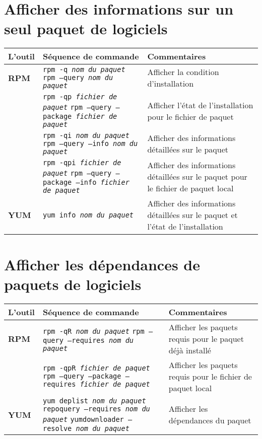 \documentclass[10pt,a4paper]{article}
\newcommand{\tabellenkopf}{
  \textbf{L'outil} & \textbf{Séquence de commande} & \textbf{Commentaires} \\
}
\begin{document}
\section{Afficher des informations sur un seul paquet de logiciels}
\begin{tabular}{ p{3.5cm} p{9cm} p{11cm}}
  \hline
  \rowcolor{Gray}
  \tabellenkopf
  \hline 
  \textbf{RPM} & \texttt{rpm -q \textit{nom du paquet}} \newline \texttt{rpm --query \textit{nom du paquet}} & Afficher la condition d'installation\\
  \rowcolor{Gray}
  & \texttt{rpm -qp \textit{fichier de paquet}} \newline \texttt{rpm --query --package \textit{fichier de paquet}}& Afficher l'état de l'installation pour le fichier de paquet\\
  & \texttt{rpm -qi \textit{nom du paquet}} \newline \texttt{rpm --query --info \textit{nom du paquet}} & Afficher des informations détaillées sur le paquet \\
  \rowcolor{Gray}
  & \texttt{rpm -qpi \textit{fichier de paquet}} \newline \texttt{rpm --query --package --info \textit{fichier de paquet}} &  Afficher des informations détaillées sur le paquet pour le fichier de paquet local\\
  \textbf{YUM} & \texttt{yum info \textit{nom du paquet}} & Afficher des informations détaillées sur le paquet et l'état de l'installation \\
  \hline
\end{tabular}

\section{Afficher les dépendances de paquets de logiciels}
\begin{tabular}{ p{3.5cm} p{9cm} p{11cm}}
  \hline
  \rowcolor{Gray}
  \tabellenkopf
  \hline 
  \textbf{RPM} & \texttt{rpm -qR \textit{nom du paquet}} \newline \texttt{rpm --query --requires \textit{nom du paquet}} & Afficher les paquets requis pour le paquet déjà installé \\
  \rowcolor{Gray}
  & \texttt{rpm -qpR \textit{fichier de paquet}} \newline \texttt{rpm --query --package --requires \textit{fichier de paquet}} & Afficher les paquets requis pour le fichier de paquet local \\
  \textbf{YUM} & \texttt{yum deplist \textit{nom du paquet}} \newline \texttt{repoquery --requires \textit{nom du paquet}} \newline \texttt{yumdownloader --resolve \textit{nom du paquet}} & Afficher les dépendances du paquet \\
  \hline
\end{tabular}
\end{document}
